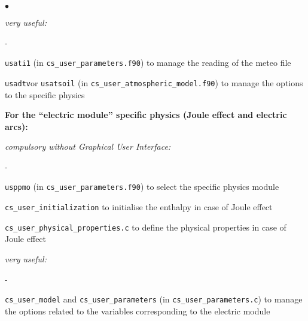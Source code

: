 {{{{{\begin{list}{$\bullet$}{}
\begin{list}{}{}
\begin{list}{}{}
        \item {\em very useful:}
        \begin{list}{-}{}
            \item  \texttt{usati1} (in \texttt{cs\_user\_parameters.f90})
                   to manage the reading of the meteo file
           \item  \texttt{usadtv}or \texttt{usatsoil} (in \texttt{cs\_user\_atmospheric\_model.f90})
                   to manage the options to the specific physics

        \end{list}
    \end{list}


     \item{\bf For the ``electric module'' specific physics
      (Joule effect and electric arcs):}

    \begin{list}{}{}
       \item {\em compulsory without Graphical User Interface:}
        \begin{list}{-}{}
            \item \texttt{usppmo} (in \texttt{cs\_user\_parameters.f90})
                  to select the specific physics module

            \item \texttt{cs\_user\_initialization} to initialise the enthalpy in
                  case of Joule effect

            \item \texttt{cs\_user\_physical\_properties.c}
                  to define the physical
                  properties in case of Joule effect
        \end{list}

        \item {\em very useful:}
        \begin{list}{-}{}
            \item  \texttt{cs\_user\_model} and \texttt{cs\_user\_parameters} (in \texttt{cs\_user\_parameters.c})
                   to manage the options related
                   to the variables corresponding to the electric module

        \end{list}
    \end{list}




\end{list}
\end{list}}}}}}
